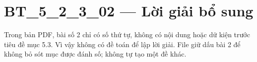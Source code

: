 \documentclass[10pt,a4paper]{article}
\begin{document}
\section*{BT\_5\_2\_3\_02 — Lời giải bổ sung}
Trong bản PDF, bài số 2 chỉ có số thứ tự, không có nội dung hoặc dữ kiện trước tiêu đề mục 5.3. Vì vậy không có đề toán để lập lời giải. File giữ dấu bài 2 để không bỏ sót mục được đánh số; không tự tạo một đề khác.
\end{document}
